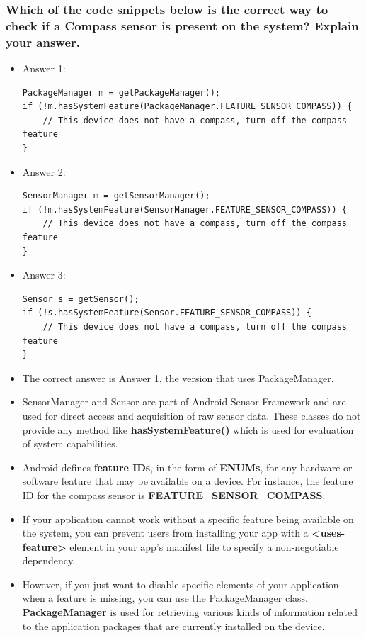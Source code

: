 \documentclass[9pt, b5paper]{article}
\begin{document}
\subsubsection{Which of the code snippets below is the correct way to check if a Compass sensor is present on the system? Explain your answer.}
\label{sec-1-5-3}
\begin{itemize}
\item Answer 1:
\begin{verbatim}
PackageManager m = getPackageManager();
if (!m.hasSystemFeature(PackageManager.FEATURE_SENSOR_COMPASS)) {
    // This device does not have a compass, turn off the compass feature
}
\end{verbatim}
\item Answer 2:
\begin{verbatim}
SensorManager m = getSensorManager();
if (!m.hasSystemFeature(SensorManager.FEATURE_SENSOR_COMPASS)) {
    // This device does not have a compass, turn off the compass feature
}
\end{verbatim}
\item Answer 3:
\begin{verbatim}
Sensor s = getSensor();
if (!s.hasSystemFeature(Sensor.FEATURE_SENSOR_COMPASS)) {
    // This device does not have a compass, turn off the compass feature
}
\end{verbatim}
\item The correct answer is Answer 1, the version that uses PackageManager.
\item SensorManager and Sensor are part of Android Sensor Framework and are used for direct access and acquisition of raw sensor data. These classes do not provide any method like \textbf{hasSystemFeature()} which is used for evaluation of system capabilities.
\item Android defines \textbf{feature IDs}, in the form of \textbf{ENUMs}, for any hardware or software feature that may be available on a device. For instance, the feature ID for the compass sensor is \textbf{FEATURE\_SENSOR\_COMPASS}.
\item If your application cannot work without a specific feature being available on the system, you can prevent users from installing your app with a \textbf{<uses-feature>} element in your app's manifest file to specify a non-negotiable dependency.
\item However, if you just want to disable specific elements of your application when a feature is missing, you can use the PackageManager class. \textbf{PackageManager} is used for retrieving various kinds of information related to the application packages that are currently installed on the device.
\end{itemize}
\end{document}
